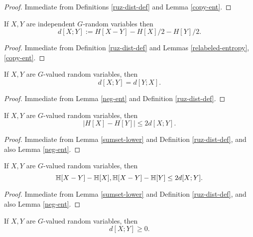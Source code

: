 \begin{proof}  Immediate from Definitions \ref{ruz-dist-def} and Lemma \ref{copy-ent}.
\end{proof}

\begin{lemma}\label{ruz-indep} If $X,Y$ are independent $G$-random variables then
  $$ d[X;Y] := H[X - Y] - H[X]/2 - H[Y]/2.$$
\end{lemma}

\begin{proof}  Immediate from Definition \ref{ruz-dist-def} and Lemmas \ref{relabeled-entropy}, \ref{copy-ent}.
\end{proof}

\begin{lemma}\label{ruzsa-symm} If $X,Y$ are $G$-valued random variables, then
  $$ d[X;Y] = d[Y;X].$$
\end{lemma}

\begin{proof}  Immediate from Lemma \ref{neg-ent} and Definition \ref{ruz-dist-def}.
\end{proof}

\begin{lemma}\label{ruzsa-diff} If $X,Y$ are $G$-valued random variables, then
$$|H[X]-H[Y]| \leq 2 d[X;Y].$$
\end{lemma}

\begin{proof}  Immediate from Lemma \ref{sumset-lower} and Definition \ref{ruz-dist-def}, and also Lemma \ref{neg-ent}.
\end{proof}

\begin{lemma}\label{ruzsa-growth} If $X,Y$ are $G$-valued random variables, then
$$  \mathbb{H}[X-Y] - \mathbb{H}[X], \mathbb{H}[X-Y] - \mathbb{H}[Y] \leq 2d[X;Y].$$
\end{lemma}

\begin{proof}  Immediate from Lemma \ref{sumset-lower} and Definition \ref{ruz-dist-def}, and also Lemma \ref{neg-ent}.
\end{proof}

\begin{lemma}\label{ruzsa-nonneg} If $X,Y$ are $G$-valued random variables, then
  $$ d[X;Y] \geq 0.$$
\end{lemma}

